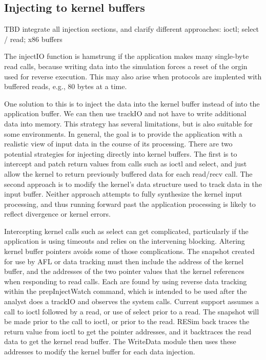 \documentclass[titlepage]{article}
\begin{document}
\begin{appendices}
\section{Injecting to kernel buffers}
TBD integrate all injection sections, and clarify different approaches: ioctl; select / read; x86 buffers

The injectIO function is hamstrung if the application makes many single-byte read calls, because writing data into the
simulation forces a reset of the orgin used for reverse execution.  This may also arise when protocols are implented
with buffered reads, e.g., 80 bytes at a time.

One solution to this is to inject the data into the kernel buffer instead of into the application buffer.
We can then use trackIO and not have to write additional data into memory.  This strategy has several limitations, but
is also suitable for some environments.  In general, the goal is to provide the application with a realistic view of
input data in the course of its processing.  There are two potential strategies for injecting directly into kernel buffers.
The first is to intercept and patch return values from calls such as ioctl and select, and just allow the kernel to 
return previously buffered data for each read/recv call.  The second approach is to modify the kernel's data structure
used to track data in the input buffer.  Neither approach attempts to fully synthesize the kernel input processing, and thus
running forward past the application processing is likely to reflect divergence or kernel errors.

Intercepting kernel calls such as select can get complicated, particularly if the application is using timeouts and relies
on the intervening blocking.  Altering kernel buffer pointers avoids some of those complications.  The snapshot created
for use by AFL or data tracking must then include the address of the kernel buffer, and the addresses of the two pointer
values that the kernel references when responding to read calls.  Each are found by using reverse data tracking within the
prepInjectWatch command, which is intended to be used after the analyst does a trackIO and observes the system calls.
Current support assumes a call to ioctl followed by a read, or use of select prior to a read.  The snapshot will be made prior to the call to ioctl, or
prior to the read.  RESim
back traces the return value from ioctl to get the pointer addresses, and it backtraces the read data to get the kernel
read buffer.  The WriteData module then uses these addresses to modify the kernel buffer for each data injection.



\end{appendices}
\end{document}
